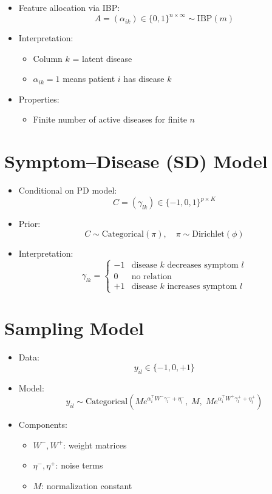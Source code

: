\documentclass[12pt,oneside]{book}
\numberwithin{equation}{section}
\theoremstyle{definition}
\theoremstyle{plain}
\theoremstyle{remark}
\begin{document}
\begin{itemize}
\item Feature allocation via IBP:
\[
A = (\alpha_{ik}) \in \{0,1\}^{n \times \infty} \sim \text{IBP}(m)
\]

\item Interpretation:
\begin{itemize}
\item Column $k$ = latent disease
\item $\alpha_{ik}=1$ means patient $i$ has disease $k$
\end{itemize}

\item Properties:
\begin{itemize}
\item Finite number of active diseases for finite $n$
\end{itemize}
\end{itemize}

\section{Symptom--Disease (SD) Model}

\begin{itemize}
\item Conditional on PD model:
\[
C = (\gamma_{lk}) \in \{-1,0,1\}^{p \times K}
\]

\item Prior:
\[
C \sim \text{Categorical}(\pi), \quad \pi \sim \text{Dirichlet}(\phi)
\]

\item Interpretation:
\[
\gamma_{lk} =
\begin{cases}
-1 & \text{disease } k \text{ decreases symptom } l \\
0 & \text{no relation} \\
+1 & \text{disease } k \text{ increases symptom } l
\end{cases}
\]
\end{itemize}

\section{Sampling Model}

\begin{itemize}
\item Data:
\[
y_{il} \in \{-1,0,+1\}
\]

\item Model:
\[
y_{il} \sim \text{Categorical}\left(
M e^{\alpha_i^\top W^- \gamma_l^- + \eta_l^-},
\; M,
\; M e^{\alpha_i^\top W^+ \gamma_l^+ + \eta_l^+}
\right)
\]

\item Components:
\begin{itemize}
\item $W^-, W^+$: weight matrices
\item $\eta^- , \eta^+$: noise terms
\item $M$: normalization constant
\end{itemize}
\end{itemize}
\end{document}
